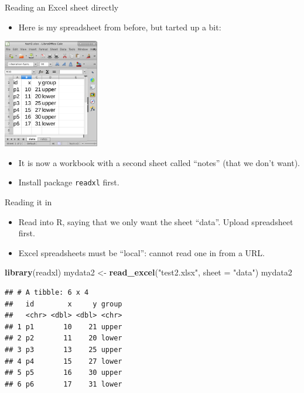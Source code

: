 \documentclass[ignorenonframetext,]{beamer}
\newenvironment{Shaded}{\begin{snugshade}}{\end{snugshade}}
\newcommand{\DataTypeTok}[1]{\textcolor[rgb]{0.13,0.29,0.53}{#1}}
\newcommand{\KeywordTok}[1]{\textcolor[rgb]{0.13,0.29,0.53}{\textbf{#1}}}
\newcommand{\NormalTok}[1]{#1}
\newcommand{\StringTok}[1]{\textcolor[rgb]{0.31,0.60,0.02}{#1}}
\providecommand{\tightlist}{%
  \setlength{\itemsep}{0pt}\setlength{\parskip}{0pt}}
\begin{document}
\begin{frame}[fragile]{Reading an Excel sheet directly}
\protect\hypertarget{reading-an-excel-sheet-directly}{}

\begin{itemize}
\tightlist
\item
  Here is my spreadsheet from before, but tarted up a bit:
\end{itemize}

\includegraphics[width=\textwidth,height=1.875in]{excel.png}

\begin{itemize}
\tightlist
\item
  It is now a workbook with a second sheet called ``notes'' (that we
  don't want).
\item
  Install package \texttt{readxl} first.
\end{itemize}

\end{frame}

\begin{frame}[fragile]{Reading it in}
\protect\hypertarget{reading-it-in}{}

\begin{itemize}
\tightlist
\item
  Read into R, saying that we only want the sheet ``data''. Upload
  spreadsheet first.
\item
  Excel spreadsheets must be ``local'': cannot read one in from a URL.
\end{itemize}

\begin{Shaded}
\begin{Highlighting}[]
\KeywordTok{library}\NormalTok{(readxl)}
\NormalTok{mydata2 <-}\StringTok{ }\KeywordTok{read_excel}\NormalTok{(}\StringTok{"test2.xlsx"}\NormalTok{, }\DataTypeTok{sheet =} \StringTok{"data"}\NormalTok{)}
\NormalTok{mydata2}
\end{Highlighting}
\end{Shaded}

\begin{verbatim}
## # A tibble: 6 x 4
##   id        x     y group
##   <chr> <dbl> <dbl> <chr>
## 1 p1       10    21 upper
## 2 p2       11    20 lower
## 3 p3       13    25 upper
## 4 p4       15    27 lower
## 5 p5       16    30 upper
## 6 p6       17    31 lower
\end{verbatim}

\end{frame}
\end{document}
